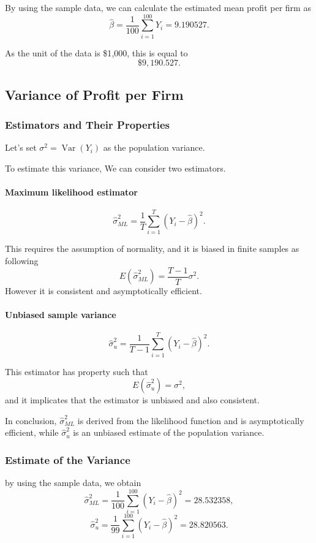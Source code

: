 \documentclass[12pt]{article}
\begin{document}
By using the sample data, we can calculate the estimated mean profit per firm as
\[
\hat \beta = \frac{1}{100}\sum_{i=1}^{100} Y_i = 9.190527.
\]

As the unit of the data is \$1{,}000, this is equal to
\[
\$9{,}190.527.
\]

\subsection{Variance of Profit per Firm}

\subsubsection{Estimators and Their Properties}

Let's set \(\sigma^2 = \operatorname{Var}(Y_i)\) as the population variance.

To estimate this variance, We can consider two estimators.

\paragraph{Maximum likelihood estimator}
\[
\hat{\sigma}^2_{ML}
=
\frac{1}{T}\sum_{i=1}^{T}(Y_i-\hat{\beta})^2.
\]

This requires the assumption of normality, and it is biased in finite samples as following
\[
E(\hat{\sigma}^2_{ML})=\frac{T-1}{T}\sigma^2.
\]
However it is consistent and asymptotically efficient.

\paragraph{Unbiased sample variance}
\[
\hat{\sigma}^2_{u}
=
\frac{1}{T-1}\sum_{i=1}^{T}(Y_i-\hat{\beta})^2.
\]

This estimator has property such that
\[
E(\hat{\sigma}^2_{u})=\sigma^2,
\]
and it implicates that the estimator is unbiased and also consistent.

\medskip

In conclusion, \(\hat{\sigma}^2_{ML}\) is derived from the likelihood function and is asymptotically efficient, while \(\hat{\sigma}^2_{u}\) is an unbiased estimate of the population variance.

\subsubsection{Estimate of the Variance}

by using the sample data, we obtain
\[
\hat{\sigma}^2_{ML}=\frac{1}{100}\sum_{i=1}^{100}(Y_i-\hat{\beta})^2 = 28.532358,
\]
\[
\hat{\sigma}^2_{u}= \frac{1}{99}\sum_{i=1}^{100}(Y_i-\hat{\beta})^2 = 28.820563.
\]
\end{document}
